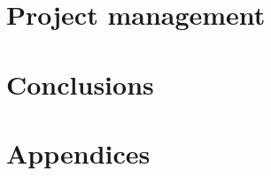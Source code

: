 \documentclass[11pt]{article}
\begin{document}
\section{Project management}
\label{sec:project-mgmt}


\section{Conclusions}
\label{sec:conclusions}


\newpage
\printbibliography[heading=bibintoc]

\newpage
\section{Appendices}
\label{sec:appendices}

\end{document}

